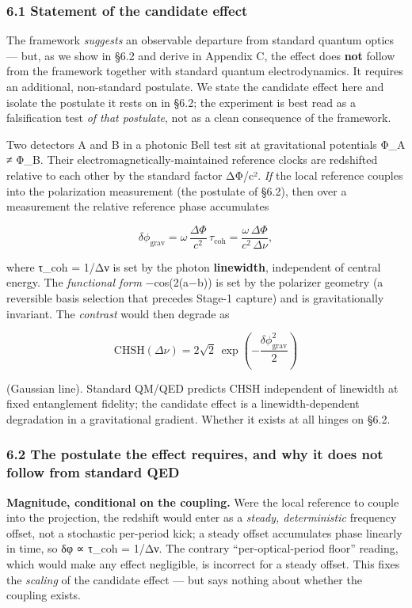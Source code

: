 \documentclass[
]{article}
\begin{document}
\subsubsection{6.1 Statement of the candidate
effect}\label{statement-of-the-candidate-effect}

The framework \emph{suggests} an observable departure from standard
quantum optics --- but, as we show in §6.2 and derive in Appendix C, the
effect does \textbf{not} follow from the framework together with
standard quantum electrodynamics. It requires an additional,
non-standard postulate. We state the candidate effect here and isolate
the postulate it rests on in §6.2; the experiment is best read as a
falsification test \emph{of that postulate}, not as a clean consequence
of the framework.

Two detectors A and B in a photonic Bell test sit at gravitational
potentials Φ\_A ≠ Φ\_B. Their electromagnetically-maintained reference
clocks are redshifted relative to each other by the standard factor
ΔΦ/c². \emph{If} the local reference couples into the polarization
measurement (the postulate of §6.2), then over a measurement the
relative reference phase accumulates

\[\delta\phi_{\text{grav}} = \omega\,\frac{\Delta\Phi}{c^2}\,\tau_{\text{coh}} = \frac{\omega\,\Delta\Phi}{c^2\,\Delta\nu},\]

where τ\_coh = 1/Δν is set by the photon \textbf{linewidth}, independent
of central energy. The \emph{functional form} −cos(2(a−b)) is set by the
polarizer geometry (a reversible basis selection that precedes Stage-1
capture) and is gravitationally invariant. The \emph{contrast} would
then degrade as

\[\text{CHSH}(\Delta\nu) = 2\sqrt{2}\,\exp\!\left(-\frac{\delta\phi_{\text{grav}}^2}{2}\right)\]

(Gaussian line). Standard QM/QED predicts CHSH independent of linewidth
at fixed entanglement fidelity; the candidate effect is a
linewidth-dependent degradation in a gravitational gradient. Whether it
exists at all hinges on §6.2.

\subsubsection{6.2 The postulate the effect requires, and why it does
not follow from standard
QED}\label{the-postulate-the-effect-requires-and-why-it-does-not-follow-from-standard-qed}

\textbf{Magnitude, conditional on the coupling.} Were the local
reference to couple into the projection, the redshift would enter as a
\emph{steady, deterministic} frequency offset, not a stochastic
per-period kick; a steady offset accumulates phase linearly in time, so
δφ ∝ τ\_coh = 1/Δν. The contrary ``per-optical-period floor'' reading,
which would make any effect negligible, is incorrect for a steady
offset. This fixes the \emph{scaling} of the candidate effect --- but
says nothing about whether the coupling exists.
\end{document}
